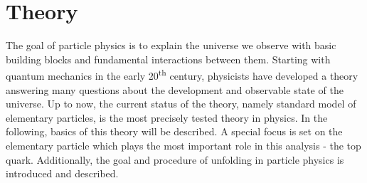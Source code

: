 \chapter{Theory}
\label{ch:Theo}
	The goal of particle physics is to explain the universe we observe with basic building blocks and fundamental interactions between them. Starting with quantum mechanics in the early 20\textsuperscript{th} century, physicists have developed a theory answering many questions about the development and observable state of the universe. Up to now, the current status of the theory, namely standard model of elementary particles, is the most precisely tested theory in physics. In the following, basics of this theory will be described. A special focus is set on the elementary particle which plays the most important role in this analysis - the top quark. Additionally, the goal and procedure of unfolding in particle physics is introduced and described.
